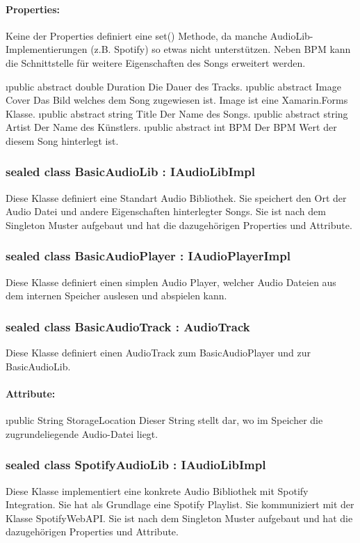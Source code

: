 \documentclass[../entwurf.tex]{subfiles}
\begin{document}
				\paragraph{Properties:}
					Keine der Properties definiert eine set() Methode, da manche AudioLib-Implementierungen (z.B. Spotify) so etwas nicht
					unterstützen. Neben BPM kann die Schnittstelle für weitere Eigenschaften des Songs erweitert werden.
					\begin{itemize}
						\i{public abstract double Duration} Die Dauer des Tracks.
						\i{public abstract Image Cover} Das Bild welches dem Song zugewiesen ist. Image ist eine Xamarin.Forms Klasse.
						\i{public abstract string Title} Der Name des Songs.
						\i{public abstract string Artist} Der Name des Künstlers.
						\i{public abstract int BPM} Der BPM Wert der diesem Song hinterlegt ist.
					\end{itemize}
			\subsubsection{sealed class BasicAudioLib : IAudioLibImpl}
				Diese Klasse definiert eine Standart Audio Bibliothek. Sie speichert den Ort der Audio Datei und andere Eigenschaften hinterlegter
				Songs. Sie ist nach dem Singleton Muster aufgebaut und hat die dazugehörigen Properties und Attribute.
			\subsubsection{sealed class BasicAudioPlayer : IAudioPlayerImpl}
				Diese Klasse definiert einen simplen Audio Player, welcher Audio Dateien aus dem internen Speicher auslesen und abspielen kann.
			\subsubsection{sealed class BasicAudioTrack : AudioTrack}
				Diese Klasse definiert einen AudioTrack zum BasicAudioPlayer und zur BasicAudioLib.
				\paragraph{Attribute:}
					\begin{itemize}
						\i{public String StorageLocation} Dieser String stellt dar, wo im Speicher die zugrundeliegende Audio-Datei liegt.
					\end{itemize}
			\subsubsection{sealed class SpotifyAudioLib : IAudioLibImpl}
				Diese Klasse implementiert eine konkrete Audio Bibliothek mit Spotify Integration.
				Sie hat als Grundlage eine Spotify Playlist. Sie kommuniziert mit der Klasse SpotifyWebAPI.
				Sie ist nach dem Singleton Muster aufgebaut und hat die dazugehörigen Properties und Attribute.
\end{document}
